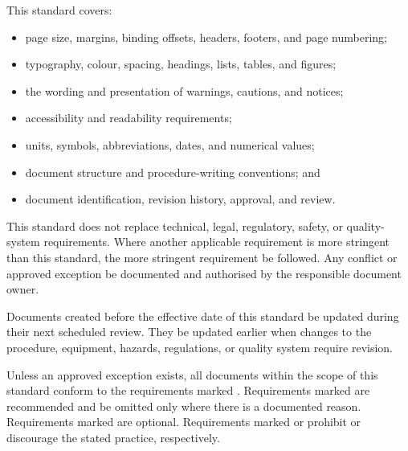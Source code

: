 This standard covers:
\begin{itemize}
    \item page size, margins, binding offsets, headers, footers, and page numbering;
    \item typography, colour, spacing, headings, lists, tables, and figures;
    \item the wording and presentation of warnings, cautions, and notices;
    \item accessibility and readability requirements;
    \item units, symbols, abbreviations, dates, and numerical values;
    \item document structure and procedure-writing conventions; and
    \item document identification, revision history, approval, and review.
\end{itemize}

This standard does not replace technical, legal, regulatory, safety, or quality-system requirements. Where another applicable requirement is more stringent than this standard, the more stringent requirement \must{} be followed. Any conflict or approved exception \must{} be documented and authorised by the responsible document owner.

Documents created before the effective date of this standard \should{} be updated during their next scheduled review. They \may{} be updated earlier when changes to the procedure, equipment, hazards, regulations, or quality system require revision.

Unless an approved exception exists, all documents within the scope of this standard \must{} conform to the requirements marked \must{}. Requirements marked \should{} are recommended and \may{} be omitted only where there is a documented reason. Requirements marked \may{} are optional. Requirements marked \mustnot{} or \shouldnot{} prohibit or discourage the stated practice, respectively.